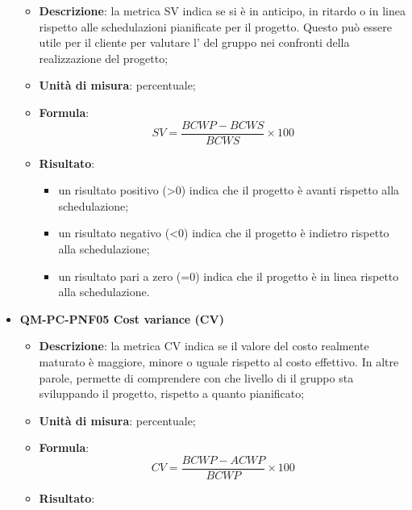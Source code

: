 \begin{itemize}
\begin{itemize}
                            \item\textbf{Descrizione}: la metrica SV indica se si è in anticipo, in ritardo o in linea rispetto alle schedulazioni pianificate per il progetto. Questo può essere utile per il cliente per valutare l' del gruppo nei confronti della realizzazione del progetto;
                            \item\textbf{Unità di misura}: percentuale;
                            \item\textbf{Formula}: \\
                                \[SV = \frac{\mathit{BCWP} - \mathit{BCWS}}{\mathit{BCWS}} \times 100\]
                            \item\textbf{Risultato}:
                                \begin{itemize}
                                    \item un risultato positivo (>0) indica che il progetto è avanti rispetto alla schedulazione;
                                    \item un risultato negativo (<0) indica che il progetto è indietro rispetto alla schedulazione;
                                    \item un risultato pari a zero (=0) indica che il progetto è in linea rispetto alla schedulazione.
                                \end{itemize}
                        \end{itemize}
                    \item\textbf{QM-PC-PNF05 Cost variance (CV)}
                        \begin{itemize}
                            \item\textbf{Descrizione}: la metrica CV indica se il valore del costo realmente maturato è maggiore, minore o uguale rispetto al costo effettivo. In altre parole, permette di comprendere con che livello di  il gruppo sta sviluppando il progetto, rispetto a quanto pianificato;
                            \item\textbf{Unità di misura}: percentuale;
                            \item\textbf{Formula}: \\
                                \[CV = \frac{\mathit{BCWP} - \mathit{ACWP}}{\mathit{BCWP}} \times 100\]
                            \item\textbf{Risultato}:
                                \begin{itemize}

\end{itemize}
\end{itemize}
\end{itemize}
